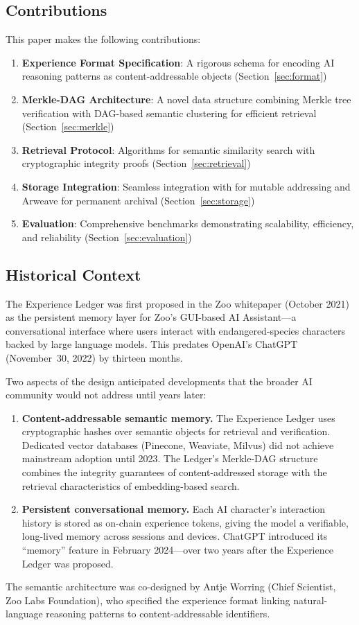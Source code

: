 \subsection{Contributions}

This paper makes the following contributions:

\begin{enumerate}
    \item \textbf{Experience Format Specification}: A rigorous schema for encoding AI reasoning patterns as content-addressable objects (Section~\ref{sec:format})

    \item \textbf{Merkle-DAG Architecture}: A novel data structure combining Merkle tree verification with DAG-based semantic clustering for efficient retrieval (Section~\ref{sec:merkle})

    \item \textbf{Retrieval Protocol}: Algorithms for semantic similarity search with cryptographic integrity proofs (Section~\ref{sec:retrieval})

    \item \textbf{Storage Integration}: Seamless integration with \IPFS{} for mutable addressing and Arweave for permanent archival (Section~\ref{sec:storage})

    \item \textbf{Evaluation}: Comprehensive benchmarks demonstrating scalability, efficiency, and reliability (Section~\ref{sec:evaluation})
\end{enumerate}

\subsection{Historical Context}

The Experience Ledger was first proposed in the Zoo whitepaper (October 2021) as the persistent memory layer for Zoo's GUI-based AI Assistant---a conversational interface where users interact with endangered-species characters backed by large language models. This predates OpenAI's ChatGPT (November~30, 2022) by thirteen months.

Two aspects of the design anticipated developments that the broader AI community would not address until years later:

\begin{enumerate}
    \item \textbf{Content-addressable semantic memory.} The Experience Ledger uses cryptographic hashes over semantic objects for retrieval and verification. Dedicated vector databases (Pinecone, Weaviate, Milvus) did not achieve mainstream adoption until 2023. The Ledger's Merkle-DAG structure combines the integrity guarantees of content-addressed storage with the retrieval characteristics of embedding-based search.
    \item \textbf{Persistent conversational memory.} Each AI character's interaction history is stored as on-chain experience tokens, giving the model a verifiable, long-lived memory across sessions and devices. ChatGPT introduced its ``memory'' feature in February 2024---over two years after the Experience Ledger was proposed.
\end{enumerate}

The semantic architecture was co-designed by Antje Worring (Chief Scientist, Zoo Labs Foundation), who specified the experience format linking natural-language reasoning patterns to content-addressable identifiers.

